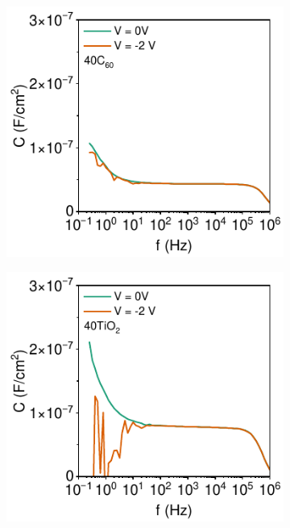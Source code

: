 \begin{figure}[htbp]
    \centering
    \begin{subfigure}{0.32\textwidth}
        \centering
        \includegraphics[width=\textwidth]{chapters/transport_layers/images/Cf_40C60.pdf}
        \caption{}
        \label{}
    \end{subfigure}
    \hfill
    \begin{subfigure}{0.32\textwidth}
        \centering
        \includegraphics[width=\textwidth]{chapters/transport_layers/images/Cf_40TiO2.pdf}

\end{subfigure}
\end{figure}
